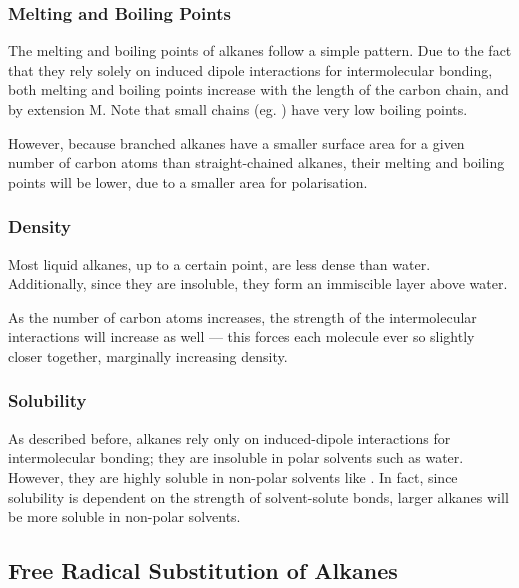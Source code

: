 	\subsubsection{Melting and Boiling Points}

		The melting and boiling points of alkanes follow a simple pattern. Due to the fact that they rely solely on induced
		dipole interactions for intermolecular bonding, both melting and boiling points increase with the length of the
		carbon chain, and by extension M. Note that small chains (eg. ) have very low boiling points.

		However, because branched alkanes have a smaller surface area for a given number of carbon atoms than straight-chained
		alkanes, their melting and boiling points will be lower, due to a smaller area for polarisation.


	\subsubsection{Density}

		Most liquid alkanes, up to a certain point, are less dense than water. Additionally, since they are insoluble,
		they form an immiscible layer above water.

		As the number of carbon atoms increases, the strength of the intermolecular interactions will increase as well –– this
		forces each molecule ever so slightly closer together, marginally increasing density.


	\subsubsection{Solubility}

		As described before, alkanes rely only on induced-dipole interactions for intermolecular bonding; they are insoluble in
		polar solvents such as water. However, they are highly soluble in non-polar solvents like . In fact,
		since solubility is dependent on the strength of solvent-solute bonds, larger alkanes will be more soluble in non-polar solvents.



\pagebreak
\subsection{Free Radical Substitution of Alkanes}

